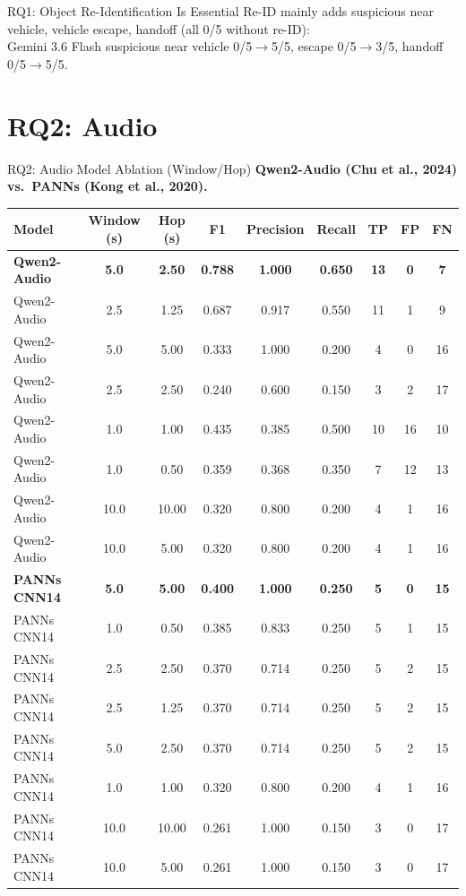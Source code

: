 \documentclass[aspectratio=169,10pt]{beamer}
\begin{document}
\begin{frame}{RQ1: Object Re-Identification Is Essential}
\vspace{\baselineskip}
Re-ID mainly adds \alert{suspicious near vehicle, vehicle escape, handoff} (all 0/5 without re-ID):\\
Gemini 3.6 Flash suspicious near vehicle 0/5$\to$5/5, escape 0/5$\to$3/5, handoff 0/5$\to$5/5.
\end{frame}

\section{RQ2: Audio}
\begin{frame}{RQ2: Audio Model Ablation (Window/Hop)}
\centering
\footnotesize
\textbf{Qwen2-Audio (Chu et al., 2024) vs.\ PANNs (Kong et al., 2020).}
\vspace{\baselineskip}
\renewcommand{\arraystretch}{0.92}

\begin{tabular}{lcccccccc}
\toprule
Model & Window (s) & Hop (s) & F1 & Precision & Recall & TP & FP & FN \\
\midrule
\textbf{Qwen2-Audio} & \textbf{5.0} & \textbf{2.50} & \textbf{0.788} & \textbf{1.000} & \textbf{0.650} & \textbf{13} & \textbf{0} & \textbf{7} \\
Qwen2-Audio & 2.5 & 1.25 & 0.687 & 0.917 & 0.550 & 11 & 1 & 9 \\
Qwen2-Audio & 5.0 & 5.00 & 0.333 & 1.000 & 0.200 & 4 & 0 & 16 \\
Qwen2-Audio & 2.5 & 2.50 & 0.240 & 0.600 & 0.150 & 3 & 2 & 17 \\
Qwen2-Audio & 1.0 & 1.00 & 0.435 & 0.385 & 0.500 & 10 & 16 & 10 \\
Qwen2-Audio & 1.0 & 0.50 & 0.359 & 0.368 & 0.350 & 7 & 12 & 13 \\
Qwen2-Audio & 10.0 & 10.00 & 0.320 & 0.800 & 0.200 & 4 & 1 & 16 \\
Qwen2-Audio & 10.0 & 5.00 & 0.320 & 0.800 & 0.200 & 4 & 1 & 16 \\
\midrule
\textbf{PANNs CNN14} & \textbf{5.0} & \textbf{5.00} & \textbf{0.400} & \textbf{1.000} & \textbf{0.250} & \textbf{5} & \textbf{0} & \textbf{15} \\
PANNs CNN14 & 1.0 & 0.50 & 0.385 & 0.833 & 0.250 & 5 & 1 & 15 \\
PANNs CNN14 & 2.5 & 2.50 & 0.370 & 0.714 & 0.250 & 5 & 2 & 15 \\
PANNs CNN14 & 2.5 & 1.25 & 0.370 & 0.714 & 0.250 & 5 & 2 & 15 \\
PANNs CNN14 & 5.0 & 2.50 & 0.370 & 0.714 & 0.250 & 5 & 2 & 15 \\
PANNs CNN14 & 1.0 & 1.00 & 0.320 & 0.800 & 0.200 & 4 & 1 & 16 \\
PANNs CNN14 & 10.0 & 10.00 & 0.261 & 1.000 & 0.150 & 3 & 0 & 17 \\
PANNs CNN14 & 10.0 & 5.00 & 0.261 & 1.000 & 0.150 & 3 & 0 & 17 \\
\bottomrule
\end{tabular}


\end{frame}
\end{document}
